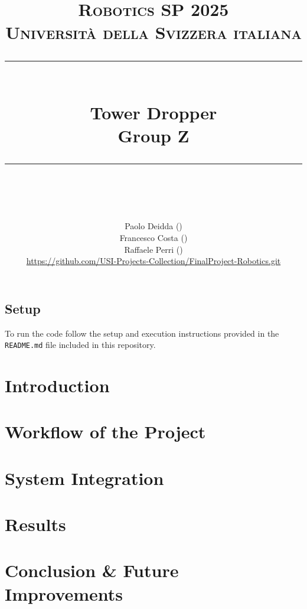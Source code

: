 \documentclass{article}
\title{
	\normalfont\normalsize
	\textsc{Robotics SP 2025\\
	Universit\`a della Svizzera italiana}\\
	\rule{\linewidth}{0.5pt}\\
	{\huge Tower Dropper\\
	\small Group Z}\\
	\rule{\linewidth}{1pt}\\
	\vspace{5pt}
}
\author{
	Paolo Deidda (\text{paolo.deidda@usi.ch}) \\ 
	Francesco Costa (\text{francesco.costa@usi.ch})\\
	Raffaele Perri (\text{raffaele.perri@usi.ch})\\
	\url{https://github.com/USI-Projects-Collection/FinalProject-Robotics.git}
	}
\begin{document}
\maketitle

\tableofcontents


\vspace*{\fill}

\subsection*{Setup}

To run the code follow the setup and execution instructions provided in the \texttt{README.md} file included in this repository.


\newpage


\section{Introduction}\label{sec:intro}


\section{Workflow of the Project}\label{sec:workflow}


\section{System Integration}\label{sec:integration}


\section{Results}\label{sec:results}


\section{Conclusion \& Future Improvements}\label{sec:conclusion}

\end{document}
